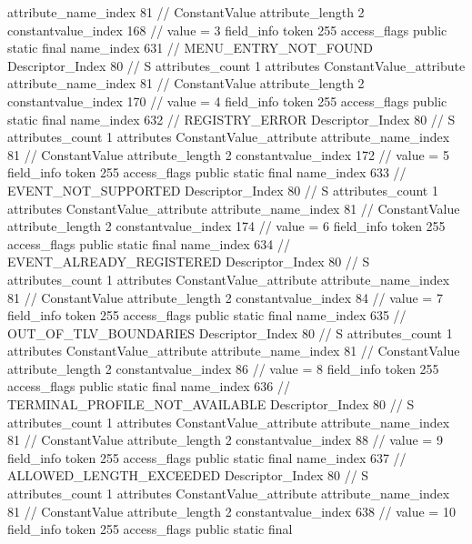 {{{{{{{					attribute_name_index	81		// ConstantValue
					attribute_length	2
					constantvalue_index	168		// value = 3
				}
				}
			}
			field_info {
				token	255
				access_flags	public static final
				name_index	631		// MENU_ENTRY_NOT_FOUND
				Descriptor_Index	80		// S
				attributes_count	1
				attributes {
				ConstantValue_attribute {
					attribute_name_index	81		// ConstantValue
					attribute_length	2
					constantvalue_index	170		// value = 4
				}
				}
			}
			field_info {
				token	255
				access_flags	public static final
				name_index	632		// REGISTRY_ERROR
				Descriptor_Index	80		// S
				attributes_count	1
				attributes {
				ConstantValue_attribute {
					attribute_name_index	81		// ConstantValue
					attribute_length	2
					constantvalue_index	172		// value = 5
				}
				}
			}
			field_info {
				token	255
				access_flags	public static final
				name_index	633		// EVENT_NOT_SUPPORTED
				Descriptor_Index	80		// S
				attributes_count	1
				attributes {
				ConstantValue_attribute {
					attribute_name_index	81		// ConstantValue
					attribute_length	2
					constantvalue_index	174		// value = 6
				}
				}
			}
			field_info {
				token	255
				access_flags	public static final
				name_index	634		// EVENT_ALREADY_REGISTERED
				Descriptor_Index	80		// S
				attributes_count	1
				attributes {
				ConstantValue_attribute {
					attribute_name_index	81		// ConstantValue
					attribute_length	2
					constantvalue_index	84		// value = 7
				}
				}
			}
			field_info {
				token	255
				access_flags	public static final
				name_index	635		// OUT_OF_TLV_BOUNDARIES
				Descriptor_Index	80		// S
				attributes_count	1
				attributes {
				ConstantValue_attribute {
					attribute_name_index	81		// ConstantValue
					attribute_length	2
					constantvalue_index	86		// value = 8
				}
				}
			}
			field_info {
				token	255
				access_flags	public static final
				name_index	636		// TERMINAL_PROFILE_NOT_AVAILABLE
				Descriptor_Index	80		// S
				attributes_count	1
				attributes {
				ConstantValue_attribute {
					attribute_name_index	81		// ConstantValue
					attribute_length	2
					constantvalue_index	88		// value = 9
				}
				}
			}
			field_info {
				token	255
				access_flags	public static final
				name_index	637		// ALLOWED_LENGTH_EXCEEDED
				Descriptor_Index	80		// S
				attributes_count	1
				attributes {
				ConstantValue_attribute {
					attribute_name_index	81		// ConstantValue
					attribute_length	2
					constantvalue_index	638		// value = 10
				}
				}
			}
			field_info {
				token	255
				access_flags	public static final
}}}}}
